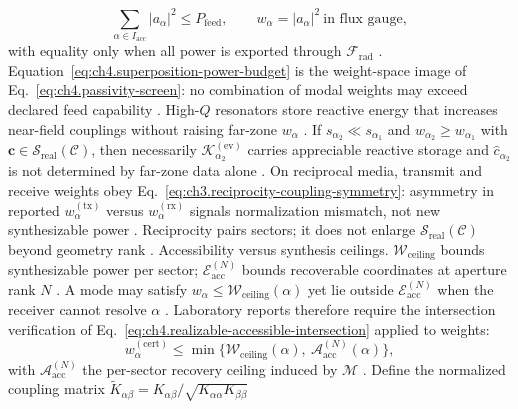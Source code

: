 \begin{equation}
\label{eq:ch4.superposition-power-budget}
\sum_{\alpha\in I_{\mathrm{acc}}}|a_{\alpha}|^{2}
\le
P_{\mathrm{feed}},
\qquad
w_{\alpha}=|a_{\alpha}|^{2}\ \text{in flux gauge},
\end{equation}
with equality only when all power is exported through \(\mathcal{F}_{\mathrm{rad}}\) \cite{stratton1941}.
Equation~\eqref{eq:ch4.superposition-power-budget} is the weight-space image of
Eq.~\eqref{eq:ch4.passivity-screen}: no combination of modal weights may exceed declared feed capability
\cite{harrington2001}. High-\(Q\) resonators store reactive energy that increases near-field couplings without raising
far-zone \(w_{\alpha}\) \cite{stratton1941}.
\label{prop:ch4.coupling-weight-ordering}
If \(s_{\alpha_{2}}\ll s_{\alpha_{1}}\) and \(w_{\alpha_{2}}\ge w_{\alpha_{1}}\) with
\(\mathbf{c}\in\mathcal{S}_{\mathrm{real}}(\mathcal{C})\), then necessarily
\(\mathcal{K}_{\alpha_{2}}^{(\mathrm{ev})}\) carries appreciable reactive storage and
\(\widehat{c}_{\alpha_{2}}\) is not determined by far-zone data alone \cite{harrington2001}.
On reciprocal media, transmit and receive weights obey
Eq.~\eqref{eq:ch3.reciprocity-coupling-symmetry}: asymmetry in reported \(w_{\alpha}^{\mathrm{(tx)}}\) versus
\(w_{\alpha}^{\mathrm{(rx)}}\) signals normalization mismatch, not new synthesizable power \cite{stratton1941}.
Reciprocity pairs sectors; it does not enlarge \(\mathcal{S}_{\mathrm{real}}(\mathcal{C})\) beyond geometry rank
\cite{devaney2004}.
Accessibility versus synthesis ceilings. \(\mathcal{W}_{\mathrm{ceiling}}\) bounds synthesizable power per sector; \(\mathcal{E}_{\mathrm{acc}}^{(N)}\) bounds
recoverable coordinates at aperture rank \(N\) \cite{harrington2001}. A mode may satisfy
\(w_{\alpha}\le\mathcal{W}_{\mathrm{ceiling}}(\alpha)\) yet lie outside \(\mathcal{E}_{\mathrm{acc}}^{(N)}\) when the
receiver cannot resolve \(\alpha\) \cite{hansen1988}. Laboratory reports therefore require the intersection verification of
Eq.~\eqref{eq:ch4.realizable-accessible-intersection} applied to weights:
\begin{equation}
\label{eq:ch4.weight-accessibility-intersection}
w_{\alpha}^{\mathrm{(cert)}}
\le
\min\big\{
\mathcal{W}_{\mathrm{ceiling}}(\alpha),\ 
\mathcal{A}_{\mathrm{acc}}^{(N)}(\alpha)
\big\},
\end{equation}
with \(\mathcal{A}_{\mathrm{acc}}^{(N)}\) the per-sector recovery ceiling induced by \(\mathcal{M}\)
\cite{devaney2004}.
Define the normalized coupling matrix \(\widetilde{K}_{\alpha\beta}=K_{\alpha\beta}/\sqrt{K_{\alpha\alpha}K_{\beta\beta}}\)
